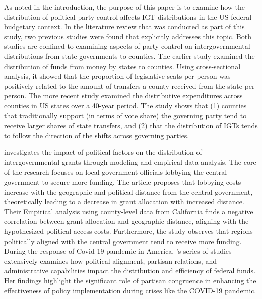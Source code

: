 As noted in the introduction, the purpose of this paper is to examine how the distribution of political party control affects IGT distributions in the US federal budgetary context.  In the literature review that was conducted as part of this study, two previous studies were found that explicitly addresses this topic\parencite{ansolabehere2002equal,ansolabehere2006party}. Both studies are confined to examining aspects of party control on intergovernmental distributions from state governments to counties. The earlier study \parencite{ansolabehere2002equal} examined the distribution of funds from money by states to counties. Using cross-sectional analysis, it showed that the proportion of legislative seats per person was positively related to the amount of transfers a county received from the state per person. The more recent study \parencite{ansolabehere2006party} examined the distributive expenditures across counties in US states over a 40-year period. The study shows that (1) counties that traditionally support (in terms of vote share) the governing party tend to receive larger shares of state transfers, and (2) that the distribution of IGTs tends to follow the direction of the shifts across governing parties.

\textcite{borck2003political} investigates the impact of political factors on the distribution of intergovernmental grants through modeling and empirical data analysis. The core of the research focuses on local government officials lobbying the central government to secure more funding. The article proposes that lobbying costs increase with the geographic and political distance from the central government, theoretically leading to a decrease in grant allocation with increased distance. Their Empirical analysis using county-level data from California finds a negative correlation between grant allocation and geographic distance, aligning with the hypothesized political access costs. Furthermore, the study observes that regions politically aligned with the central government tend to receive more funding. During the response of Covid-19 pandemic in America, \textcite{terman2015performance,terman2020getting,terman2015improving,terman2022even}'s series of studies extensively examines how political alignment, partisan relations, and administrative capabilities impact the distribution and efficiency of federal funds. Her findings highlight the significant role of partisan congruence in enhancing the effectiveness of policy implementation during crises like the COVID-19 pandemic.

